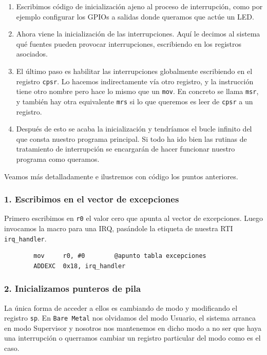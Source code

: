 \begin{enumerate}
  \item Escribimos código de inicialización ajeno al proceso de interrupción, como por ejemplo
        configurar los GPIOs a salidas donde queramos que actúe un LED.
  \item Ahora viene la inicialización de las interrupciones. Aquí le decimos al sistema qué fuentes
        pueden provocar interrupciones, escribiendo en los registros asociados. 
  \item El último paso es habilitar las interrupciones globalmente escribiendo en el registro
        {\tt cpsr}. Lo hacemos indirectamente vía otro registro, y la instrucción tiene otro
        nombre pero hace lo mismo que un {\tt mov}. En concreto se llama {\tt msr}, y también hay
        otra equivalente {\tt mrs} si lo que queremos es leer de {\tt cpsr} a un registro.
  \item Después de esto se acaba la inicialización y tendríamos el bucle infinito del que consta
        nuestro programa principal. Si todo ha ido bien las rutinas de tratamiento de interrupción
        se encargarán de hacer funcionar nuestro programa como queramos.
\end{enumerate}

Veamos más detalladamente e ilustremos con código los puntos anteriores.

\subsubsection{1. Escribimos en el vector de excepciones}

  Primero escribimos en {\tt r0} el valor cero que apunta al vector de excepciones.
  Luego invocamos la macro para una IRQ, pasándole la etiqueta de nuestra RTI {\tt irq\_handler}.
\begin{lstlisting}
        mov     r0, #0        @apunto tabla excepciones
        ADDEXC  0x18, irq_handler
\end{lstlisting}

\subsubsection{2. Inicializamos punteros de pila}

La única forma de acceder a ellos es cambiando de modo y modificando el registro {\tt sp}. En
{\tt Bare Metal} nos olvidamos del modo Usuario, el sistema arranca en modo Supervisor y
nosotros nos mantenemos en dicho modo a no ser que haya una interrupción o querramos cambiar
un registro particular del modo como es el caso.

